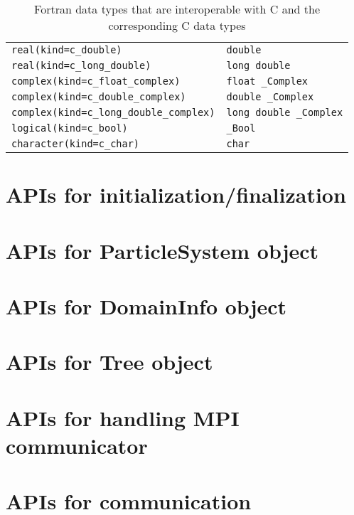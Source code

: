\documentclass[12pt,a4paper,dvipdfmx]{book} %
\begin{document}
\begin{table}[H]
\begin{tabularx}{\linewidth}{XX}
\texttt{real(kind=c\_double)}                   & \texttt{double}\\
\texttt{real(kind=c\_long\_double)}             & \texttt{long double}\\
\texttt{complex(kind=c\_float\_complex)}        & \texttt{float \_Complex}\\
\texttt{complex(kind=c\_double\_complex)}       & \texttt{double \_Complex}\\
\texttt{complex(kind=c\_long\_double\_complex)} & \texttt{long double \_Complex}\\
\texttt{logical(kind=c\_bool)}                  & \texttt{\_Bool}\\
\texttt{character(kind=c\_char)}                & \texttt{char}\\
\bottomrule
\end{tabularx}
\caption{Fortran data types that are interoperable with C and the corresponding C data types}
\label{tbl:interoperable_data_types}
\end{table}
\clearpage

\section{APIs for initialization/finalization}
\label{sec:initfin_APIs}

\newpage
\section{APIs for ParticleSystem object}
\label{sec:psys_APIs}

\newpage
\section{APIs for DomainInfo object}
\label{sec:dinfo_APIs}

\newpage
\section{APIs for Tree object}
\label{sec:tree_APIs}

\newpage
\section{APIs for handling MPI communicator}
\label{sec:comminfo_APIs}

\newpage
\section{APIs for communication}
\label{sec:comm_APIs}

\newpage
\end{document}
